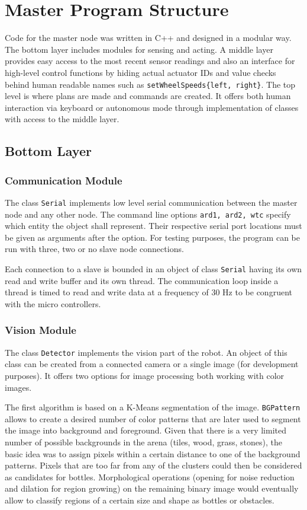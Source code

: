 \section{Master Program Structure}
Code for the master node was written in C++ and designed in a modular way. The bottom
layer includes modules for sensing and acting. A middle layer provides easy access to 
the most recent sensor readings and also an interface for high-level control functions
by hiding actual actuator IDs and value checks behind human readable names such as
\texttt{setWheelSpeeds\{left, right\}}. The top level is where plans are made and 
commands are created. It offers both human interaction via keyboard or autonomous mode
through implementation of classes with access to the middle layer.

\subsection{Bottom Layer}

\subsubsection{Communication Module}
The class \texttt{Serial} implements low level serial communication between the master
node and any other node. The command line options \texttt{ard1, ard2, wtc} specify 
which entity the object shall represent. Their respective serial port locations must
be given as arguments after the option. For testing purposes, the program can be run
with three, two or no slave node connections.

Each connection to a slave is bounded in an object of class \texttt{Serial} having 
its own read and write buffer and its own thread. The communication loop inside a thread
is timed to read and write data at a frequency of 30 Hz to be congruent with the
micro controllers.

\subsubsection{Vision Module}
The class \texttt{Detector} implements the vision part of the robot. An object of this
class can be created from a connected camera or a single image (for development purposes).
It offers two options for image processing both working with color images. 

The first algorithm is based on a K-Means segmentation of the image. \texttt{BGPattern} allows
to create a desired number of color patterns that are later used to segment the image
into background and foreground. Given that there is a very limited number of possible
backgrounds in the arena (tiles, wood, grass, stones), the basic idea was to assign 
pixels within a certain distance to one of the background patterns. Pixels that are too
far from any of the clusters could then be considered as candidates for bottles.
Morphological operations (opening for noise reduction and dilation for region growing)
on the remaining binary image would eventually allow to classify regions of a certain
size and shape as bottles or obstacles.

